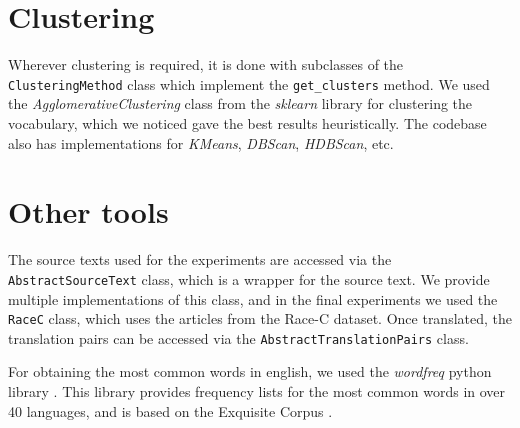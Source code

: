 \section{Clustering}
Wherever clustering is required, it is done with subclasses of the \texttt{ClusteringMethod} class which implement the \texttt{get\_clusters} method.
We used the \textit{AgglomerativeClustering} class from the \textit{sklearn} library for clustering the vocabulary, which we noticed gave the best 
results heuristically. The codebase also has implementations for \textit{KMeans}, \textit{DBScan}, \textit{HDBScan}, etc.

\section{Other tools}
The source texts used for the experiments are accessed via the \texttt{AbstractSourceText} class, which is a wrapper for the source text.
We provide multiple implementations of this class, and in the final experiments we used the \texttt{RaceC} class, which uses the articles from
the Race-C dataset. Once translated, the translation pairs can be accessed via the \texttt{AbstractTranslationPairs} class. 

For obtaining the most common words in english, we used the \textit{wordfreq} python library \cite{speerRspeerWordfreq2025}. This library provides
frequency lists for the most common words in over 40 languages, and is based on the Exquisite Corpus \cite{LuminosoInsightExquisitecorpus2025}.